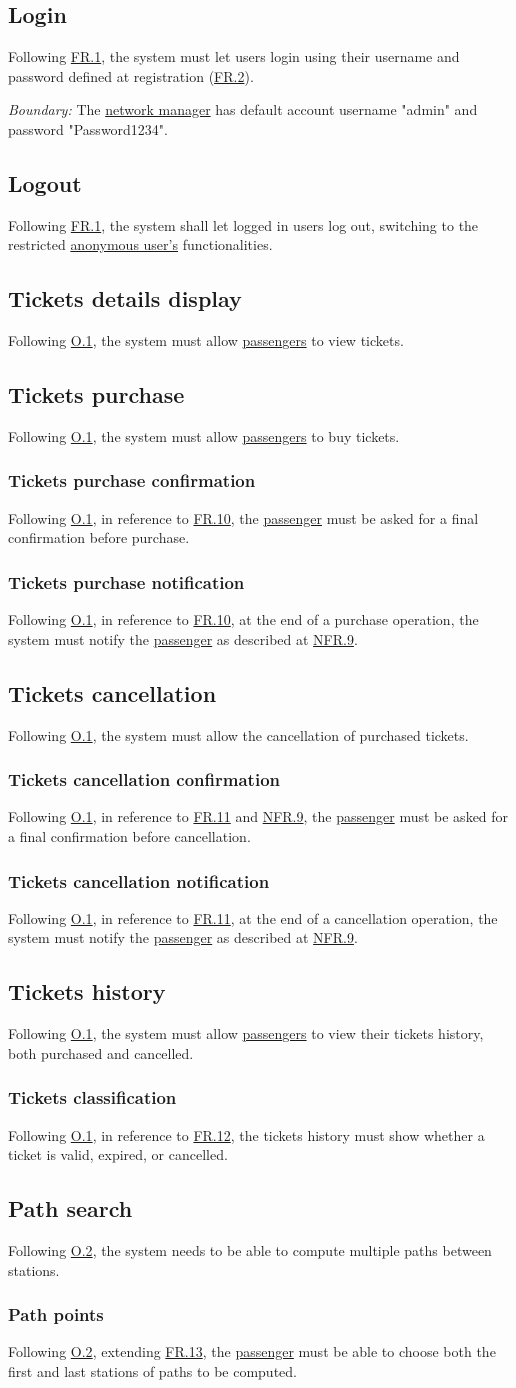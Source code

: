 \documentclass[12pt]{article}
\renewcommand\it[1]{\textit{#1}}
\newcommand\un[1]{\underline{#1}}
\newcommand\hyl[1]{\hyperref[#1]{#1}}
\newcommand\subs[2]{\subsection{#1}\label{#2}}
\newcommand\ssubs[2]{\subsubsection{#1}\label{#2}}
\begin{document}
\subs{Login}{FR.7}
Following \hyl{FR.1}, the system must let users login using their username and password defined at registration (\hyl{FR.2}).

\it{Boundary:} The \un{network manager} has default account username "admin" and password "Password1234".

\subs{Logout}{FR.8}
Following \hyl{FR.1}, the system shall let logged in users log out, switching to the restricted \un{anonymous user's} 
functionalities. 

\subs{Tickets details display}{FR.9}
Following \hyl{O.1}, the system must allow \un{passengers} to view tickets. 

\subs{Tickets purchase}{FR.10}
Following \hyl{O.1}, the system must allow \un{passengers} to buy tickets.

\ssubs{Tickets purchase confirmation}{FR.10.1}
Following \hyl{O.1}, in reference to \hyl{FR.10}, the \un{passenger} must be asked for a final confirmation before purchase.

\ssubs{Tickets purchase notification}{FR.10.2}
Following \hyl{O.1}, in reference to \hyl{FR.10}, at the end of a purchase operation, the system must notify the \un{passenger} as 
described at \hyl{NFR.9}.

\subs{Tickets cancellation}{FR.11}
Following \hyl{O.1}, the system must allow the cancellation of purchased tickets. 

\ssubs{Tickets cancellation confirmation}{FR.11.1}
Following \hyl{O.1}, in reference to \hyl{FR.11} and \hyl{NFR.9}, the \un{passenger} must be asked for a final confirmation before 
cancellation.

\ssubs{Tickets cancellation notification}{FR.11.2}
Following \hyl{O.1}, in reference to \hyl{FR.11}, at the end of a cancellation operation, the system must notify the \un{passenger} as 
described at \hyl{NFR.9}.

\subs{Tickets history}{FR.12}
Following \hyl{O.1}, the system must allow \un{passengers} to view their tickets history, both purchased and cancelled.

\ssubs{Tickets classification}{FR.12.1}
Following \hyl{O.1}, in reference to \hyl{FR.12}, the tickets history must show whether a ticket is valid, expired, or 
cancelled.

\subs{Path search}{FR.13}
Following \hyl{O.2}, the system needs to be able to compute multiple paths between stations.

\ssubs{Path points}{FR.13.1}
Following \hyl{O.2}, extending \hyl{FR.13}, the \un{passenger} must be able to choose both the first and last stations of paths to be computed.
\end{document}
